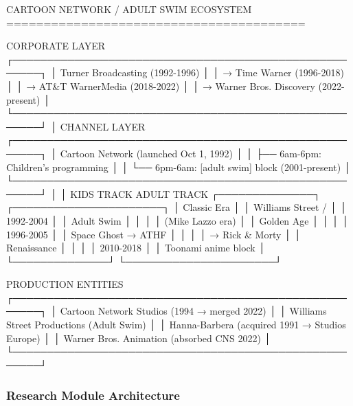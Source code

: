 \documentclass[11pt,letterpaper]{article}
\begin{document}
\begin{asciibox}
CARTOON NETWORK / ADULT SWIM ECOSYSTEM
========================================

  CORPORATE LAYER
  ┌──────────────────────────────────────────────────────┐
  │  Turner Broadcasting (1992-1996)                     │
  │    → Time Warner (1996-2018)                         │
  │    → AT&T WarnerMedia (2018-2022)                    │
  │    → Warner Bros. Discovery (2022-present)           │
  └──────────────────────────────────────────────────────┘
          │
  CHANNEL LAYER
  ┌──────────────────────────────────────────────────────┐
  │  Cartoon Network (launched Oct 1, 1992)              │
  │  ├── 6am-6pm: Children's programming                 │
  │  └── 6pm-6am: [adult swim] block (2001-present)      │
  └──────────────────────────────────────────────────────┘
          │                           │
  KIDS TRACK                   ADULT TRACK
  ┌──────────────┐              ┌──────────────────────┐
  │ Classic Era  │              │ Williams Street /    │
  │ 1992-2004    │              │ Adult Swim           │
  │              │              │ (Mike Lazzo era)     │
  │ Golden Age   │              │                      │
  │ 1996-2005    │              │ Space Ghost → ATHF   │
  │              │              │ → Rick & Morty       │
  │ Renaissance  │              │                      │
  │ 2010-2018    │              │ Toonami anime block  │
  └──────────────┘              └──────────────────────┘

  PRODUCTION ENTITIES
  ┌──────────────────────────────────────────────────────┐
  │ Cartoon Network Studios (1994 → merged 2022)         │
  │ Williams Street Productions (Adult Swim)             │
  │ Hanna-Barbera (acquired 1991 → Studios Europe)       │
  │ Warner Bros. Animation (absorbed CNS 2022)           │
  └──────────────────────────────────────────────────────┘
\end{asciibox}

\subsubsection{Research Module Architecture}
\end{document}

